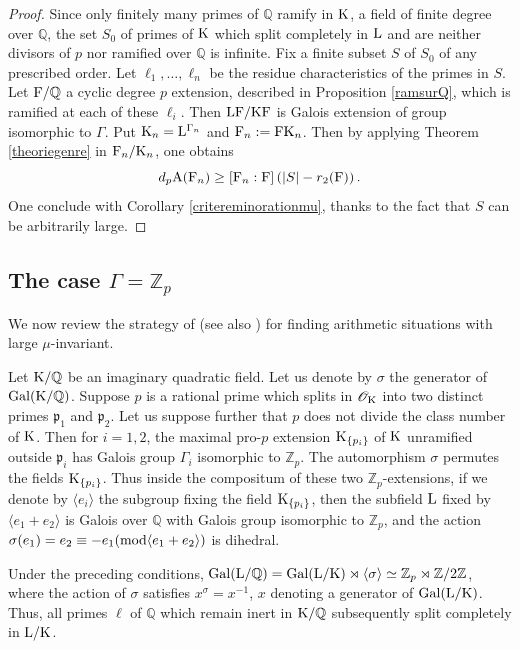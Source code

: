 \documentclass[12pt,a4paper,twoside,english]{smfart}
\def\K{{\rm K}}
\def\L{{\rm L}}
\def\F{{\rm F}}
\def\Q{{\mathbb Q}}
\def\Z{{\mathbb Z}}
\def\O{{\mathcal O}}
\def\p{{\mathfrak p}}
\def\Gal{{\rm Gal}}
\def\A{{\rm A}}
\def\mod{{\rm mod}}
\begin{document}
 
 \begin{proof}
 Since only finitely many primes of $\Q$ ramify in $\K$, a field of finite degree over $\Q$, the set $S_0$ of primes of $\K$ which split completely in $\L$ and are neither divisors of $p$ nor ramified over $\Q$ is infinite.  Fix a finite subset $S$ of $S_0$ of any prescribed order.  Let $\ell_1, \ldots, \ell_n$
be the residue characteristics of the primes in $S$.
 Let $\F/\Q$ a cyclic degree $p$ extension, described in Proposition \ref{ramsurQ}, which
  is ramified at each of these $\ell_i$. Then $\L\F/\K\F$ is Galois extension of group isomorphic to $\Gamma$. Put $\K_n=\L^{\Gamma_n}$ and $\F_n:=\F\K_n$.
  Then by applying Theorem \ref{theoriegenre} in $\F_n/\K_n$, one obtains
  $$d_p \A(\F_n) \geq [\F_n:\F]\left( |S|-r_2(\F)\right).$$
  One conclude with Corollary \ref{critereminorationmu}, thanks to the fact that $S$ can be arbitrarily large.

 \end{proof}
 
\subsection{The case $\Gamma = \Z_p$} \label{sectioncommutatif}

We now review the strategy of \cite{Iwasawa} (see also \cite[\S 4.5]{Serre}) for finding arithmetic situations with large $\mu$-invariant.

Let $\K/\Q$ be an imaginary quadratic field.  Let us denote by $\sigma$ the generator of 
$\Gal(\K/\Q)$. Suppose $p$ is a rational prime which splits in $\O_\K$ into two distinct primes $\p_1$ and $\p_2$.  Let us suppose further that $p$ does not divide the class number of $\K$.  Then for $i=1,2$, the maximal pro-$p$ extension $\K_{\{\p_i\}}$ of $\K$ unramified outside $\p_i$ has Galois group $\Gamma_i$ isomorphic to $\Z_p$.  The automorphism $\sigma$ permutes the fields  $\K_{\{\p_i\}}$.  Thus inside the compositum of these two $\Z_p$-extensions, if we denote by  $\langle e_i\rangle$
the subgroup fixing the field $\K_{\{\p_i\}}$, then the subfield $\L$ fixed by $\langle e_1+e_2 \rangle $ is Galois over $\Q$ with Galois group isomorphic to $\Z_p$, and the action $\sigma(e_1)= e_2\equiv -e_1 (\mod \langle e_1+e_2 \rangle )$ is dihedral.



\begin{coro}\label{quadratiquecase}
Under the preceding conditions, $\Gal(\L/\Q) =  \Gal(\L/\K) \rtimes \langle\sigma\rangle  \simeq \Z_p \rtimes \Z/2\Z$, where the action of 
$\sigma$ satisfies $x^\sigma=x^{-1}$, $x$ denoting a generator of $\Gal(\L/\K)$.
Thus, all primes $\ell$ of $\Q$ which remain inert in $\K/\Q$ subsequently split completely in $\L/\K$.
\end{coro}
  
\end{document}
